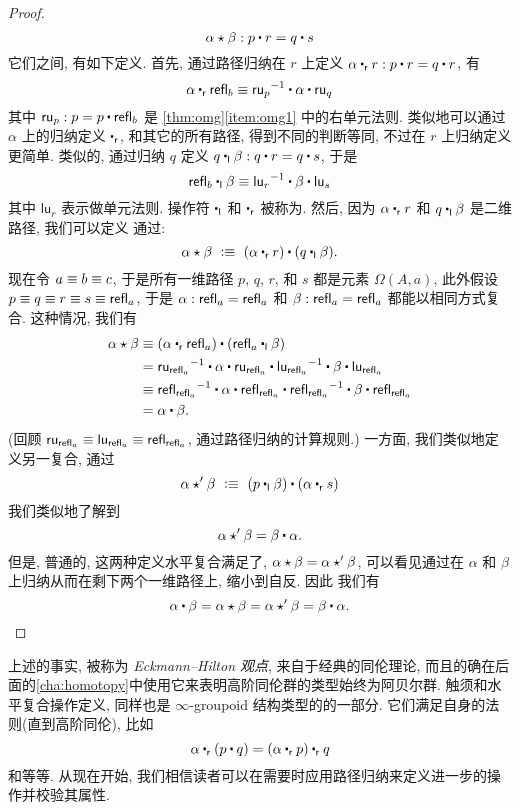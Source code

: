 \begin{proof}
\begin{equation*}
\alpha\hct\beta : p\ct r = q\ct s
\end{equation*}
%
它们之间, 有如下定义. 首先, 通过路径归纳在 $r$ 上定义 $\alpha \rightwhisker r : p\ct r = q\ct r$, 有 \[ \alpha \rightwhisker \refl{b} \jdeq \opp{\mathsf{ru}_p} \ct \alpha \ct \mathsf{ru}_q \]
其中 $\mathsf{ru}_p : p = p \ct \refl{b}$ 是 \cref{thm:omg}\ref{item:omg1} 中的右单元法则. 类似地可以通过 $\alpha$ 上的归纳定义 $\rightwhisker$, 和其它的所有路径, 得到不同的判断等同, 不过在 $r$ 上归纳定义更简单. 类似的, 通过归纳 $q$ 定义 $q\leftwhisker \beta : q\ct r = q\ct s$, 于是 \[ \refl{b} \leftwhisker \beta \jdeq \opp{\mathsf{lu}_r} \ct \beta \ct \mathsf{lu}_s \]
其中 $\mathsf{lu}_r$ 表示做单元法则. 操作符 $\leftwhisker$ 和 $\rightwhisker$ 被称为. 然后, 因为 $\alpha \rightwhisker r$ 和 $q\leftwhisker \beta$ 是二维路径, 我们可以定义 %
%
通过: \[
\alpha\hct\beta\ \defeq\ (\alpha\rightwhisker r) \ct (q\leftwhisker \beta).
\]
现在令 $a \equiv b \equiv c$, 于是所有一维路径 $p$, $q$, $r$, 和 $s$ 都是元素 $\Omega(A,a)$, 此外假设 $p\equiv q \equiv r \equiv s\equiv \mathsf{refl}_{a}$, 于是 $\alpha:\mathsf{refl}_{a} = \mathsf{refl}_{a}$ 和 $\beta:\mathsf{refl}_{a} = \mathsf{refl}_{a}$ 都能以相同方式复合. 这种情况, 我们有 \begin{align*}
\alpha\hct\beta
&\jdeq (\alpha\rightwhisker\refl{a}) \ct (\refl{a}\leftwhisker \beta)\\
&= \opp{\mathsf{ru}_{\refl{a}}} \ct \alpha \ct \mathsf{ru}_{\refl{a}} \ct \opp{\mathsf{lu}_{\refl a}} \ct \beta \ct \mathsf{lu}_{\refl{a}}\\
&\jdeq \opp{\refl{\refl{a}}} \ct \alpha \ct \refl{\refl{a}} \ct \opp{\refl{\refl a}} \ct \beta \ct \refl{\refl{a}}\\
&= \alpha \ct \beta.
\end{align*}
(回顾 $\mathsf{ru}_{\mathsf{refl}_{a}} \equiv \mathsf{lu}_{\mathsf{refl}_{a}} \equiv \mathsf{refl}_{\mathsf{refl}_{a}}$, 通过路径归纳的计算规则.) 一方面, 我们类似地定义另一复合, 通过 \[
\alpha\hct'\beta\ \defeq\ (p\leftwhisker \beta)\ct (\alpha\rightwhisker s)
\]
我们类似地了解到 \[
\alpha\hct'\beta = \beta\ct\alpha.
\]
%
但是, 普通的, 这两种定义水平复合满足了, $\alpha\star\beta = \alpha\star'\beta$, 可以看见通过在 $\alpha$ 和 $\beta$ 上归纳从而在剩下两个一维路径上, 缩小到自反. 因此 我们有 \[\alpha \ct \beta = \alpha\hct\beta = \alpha\hct'\beta = \beta\ct\alpha.
\qedhere
\]
\end{proof}

上述的事实, 被称为 \emph{Eckmann–Hilton 观点}, 来自于经典的同伦理论, 而且的确在后面的\cref{cha:homotopy}中使用它来表明高阶同伦群的类型始终为阿贝尔群. 触须和水平复合操作定义, 同样也是 $\infty$-groupoid 结构类型的的一部分. 它们满足自身的法则(直到高阶同伦), 比如 \[ \alpha \rightwhisker (p\ct q) = (\alpha \rightwhisker p) \rightwhisker q \]
和等等. 从现在开始, 我们相信读者可以在需要时应用路径归纳来定义进一步的操作并校验其属性. 

